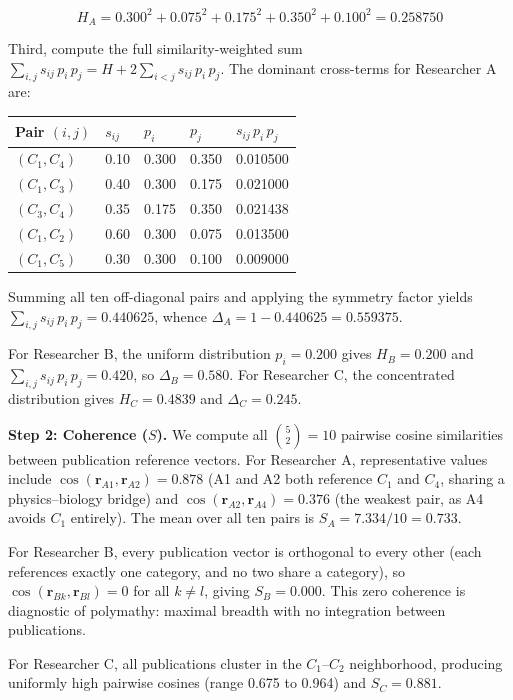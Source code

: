 \documentclass[
]{article}
\begin{document}
\[H_A = 0.300^2 + 0.075^2 + 0.175^2 + 0.350^2 + 0.100^2 = 0.258750\]

Third, compute the full similarity-weighted sum
\(\sum_{i,j} s_{ij}\,p_i\,p_j = H + 2\sum_{i < j} s_{ij}\,p_i\,p_j\).
The dominant cross-terms for Researcher A are:

\begin{longtable}[]{@{}lllll@{}}
\toprule
Pair \((i,j)\) & \(s_{ij}\) & \(p_i\) & \(p_j\) &
\(s_{ij}\,p_i\,p_j\) \\
\midrule
\endhead
\((C_1,C_4)\) & 0.10 & 0.300 & 0.350 & 0.010500 \\
\((C_1,C_3)\) & 0.40 & 0.300 & 0.175 & 0.021000 \\
\((C_3,C_4)\) & 0.35 & 0.175 & 0.350 & 0.021438 \\
\((C_1,C_2)\) & 0.60 & 0.300 & 0.075 & 0.013500 \\
\((C_1,C_5)\) & 0.30 & 0.300 & 0.100 & 0.009000 \\
\bottomrule
\end{longtable}

Summing all ten off-diagonal pairs and applying the symmetry factor
yields \(\sum_{i,j} s_{ij}\,p_i\,p_j = 0.440625\), whence
\(\Delta_A = 1 - 0.440625 = 0.559375\).

For Researcher B, the uniform distribution \(p_i = 0.200\) gives
\(H_B = 0.200\) and \(\sum_{i,j} s_{ij}\,p_i\,p_j = 0.420\), so
\(\Delta_B = 0.580\). For Researcher C, the concentrated distribution
gives \(H_C = 0.4839\) and \(\Delta_C = 0.245\).

\textbf{Step 2: Coherence (\(S\)).} We compute all \(\binom{5}{2} = 10\)
pairwise cosine similarities between publication reference vectors. For
Researcher A, representative values include
\(\cos(\mathbf{r}_{A1}, \mathbf{r}_{A2}) = 0.878\) (A1 and A2 both
reference \(C_1\) and \(C_4\), sharing a physics--biology bridge) and
\(\cos(\mathbf{r}_{A2}, \mathbf{r}_{A4}) = 0.376\) (the weakest pair, as
A4 avoids \(C_1\) entirely). The mean over all ten pairs is
\(S_A = 7.334/10 = 0.733\).

For Researcher B, every publication vector is orthogonal to every other
(each references exactly one category, and no two share a category), so
\(\cos(\mathbf{r}_{Bk}, \mathbf{r}_{Bl}) = 0\) for all \(k \neq l\),
giving \(S_B = 0.000\). This zero coherence is diagnostic of polymathy:
maximal breadth with no integration between publications.

For Researcher C, all publications cluster in the \(C_1\)--\(C_2\)
neighborhood, producing uniformly high pairwise cosines (range 0.675 to
0.964) and \(S_C = 0.881\).
\end{document}
